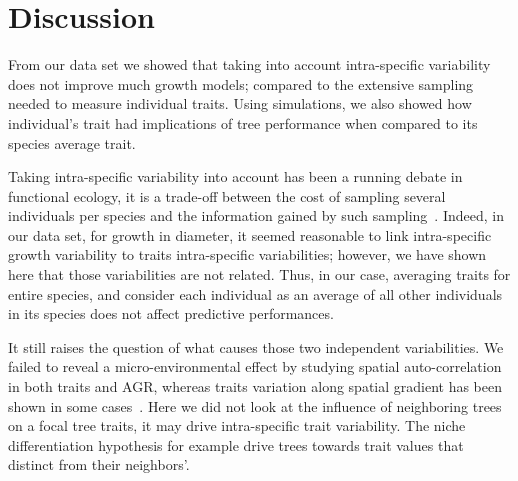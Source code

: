 \label{sec:Disc}
\section*{Discussion}

From our data set we showed that taking into account intra-specific variability does not improve much growth models; compared to the extensive sampling needed to measure individual traits. Using simulations, we also showed how individual's trait had implications of tree performance when compared to its species average trait.

Taking intra-specific variability into account has been a running debate in functional ecology, it is a trade-off between the cost of sampling several individuals per species and the information gained by such sampling~\citep{albert_when_2011, violle_return_2012}. Indeed, in our data set, for growth in diameter, it seemed reasonable to link intra-specific growth variability to traits intra-specific variabilities; however, we have shown here that those variabilities are not related. Thus, in our case, averaging traits for entire species, and consider each individual as an average of all other individuals in its species does not affect predictive performances.

It still raises the question of what causes those two independent variabilities. We failed to reveal a micro-environmental effect by studying spatial auto-correlation in both traits and AGR, whereas traits variation along spatial gradient has been shown in some cases~\cite{NEEDED}. Here we did not look at the influence of neighboring trees on a focal tree traits, it may drive intra-specific trait variability. The niche differentiation hypothesis for example drive trees towards trait values that distinct from their neighbors'.

